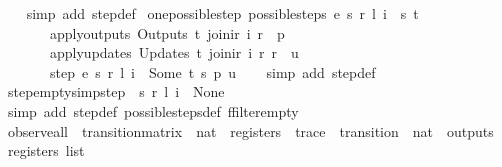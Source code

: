 \begin{isabellebody}
\ \ %
\endisadelimproof
%
\isatagproof
{}\isamarkupfalse%
\ {\isacharparenleft}simp\ add{\isacharcolon}\ step{\isacharunderscore}def{\isacharparenright}%
\endisatagproof
{\isafoldproof}%
%
\isadelimproof
\isanewline
%
\endisadelimproof
\isanewline
{}\isamarkupfalse%
\ one{\isacharunderscore}possible{\isacharunderscore}step{\isacharcolon}\ {\isachardoublequoteopen}possible{\isacharunderscore}steps\ e\ s\ r\ l\ i\ {\isacharequal}\ {\isacharbraceleft}{\isacharbar}{\isacharparenleft}s{\isacharprime}{\isacharcomma}\ t{\isacharparenright}{\isacharbar}{\isacharbraceright}\ {\isasymLongrightarrow}\isanewline
\ \ \ \ \ \ \ apply{\isacharunderscore}outputs\ {\isacharparenleft}Outputs\ t{\isacharparenright}\ {\isacharparenleft}join{\isacharunderscore}ir\ i\ r{\isacharparenright}\ {\isacharequal}\ p\ {\isasymLongrightarrow}\isanewline
\ \ \ \ \ \ \ apply{\isacharunderscore}updates\ {\isacharparenleft}Updates\ t{\isacharparenright}\ {\isacharparenleft}join{\isacharunderscore}ir\ i\ r{\isacharparenright}\ r\ {\isacharequal}\ u\ {\isasymLongrightarrow}\isanewline
\ \ \ \ \ \ \ step\ e\ s\ r\ l\ i\ {\isacharequal}\ Some\ {\isacharparenleft}t{\isacharcomma}\ s{\isacharprime}{\isacharcomma}\ p{\isacharcomma}\ u{\isacharparenright}{\isachardoublequoteclose}\isanewline
%
\isadelimproof
\ \ %
\endisadelimproof
%
\isatagproof
{}\isamarkupfalse%
\ {\isacharparenleft}simp\ add{\isacharcolon}\ step{\isacharunderscore}def{\isacharparenright}%
\endisatagproof
{\isafoldproof}%
%
\isadelimproof
\isanewline
%
\endisadelimproof
\isanewline
{}\isamarkupfalse%
\ step{\isacharunderscore}empty{\isacharbrackleft}simp{\isacharbrackright}{\isacharcolon}{\isachardoublequoteopen}step\ {\isacharbraceleft}{\isacharbar}{\isacharbar}{\isacharbraceright}\ s\ r\ l\ i\ {\isacharequal}\ None{\isachardoublequoteclose}\isanewline
%
\isadelimproof
\ \ %
\endisadelimproof
%
\isatagproof
{}\isamarkupfalse%
\ {\isacharparenleft}simp\ add{\isacharcolon}\ step{\isacharunderscore}def\ possible{\isacharunderscore}steps{\isacharunderscore}def\ ffilter{\isacharunderscore}empty{\isacharparenright}%
\endisatagproof
{\isafoldproof}%
%
\isadelimproof
\isanewline
%
\endisadelimproof
\isanewline
{}\isamarkupfalse%
\ observe{\isacharunderscore}all\ {\isacharcolon}{\isacharcolon}\ {\isachardoublequoteopen}transition{\isacharunderscore}matrix\ {\isasymRightarrow}\ nat\ {\isasymRightarrow}\ registers\ {\isasymRightarrow}\ trace\ {\isasymRightarrow}\ {\isacharparenleft}transition\ {\isasymtimes}\ nat\ {\isasymtimes}\ outputs\ {\isasymtimes}\ registers{\isacharparenright}\ list{\isachardoublequoteclose}\ \isanewline

\end{isabellebody}
